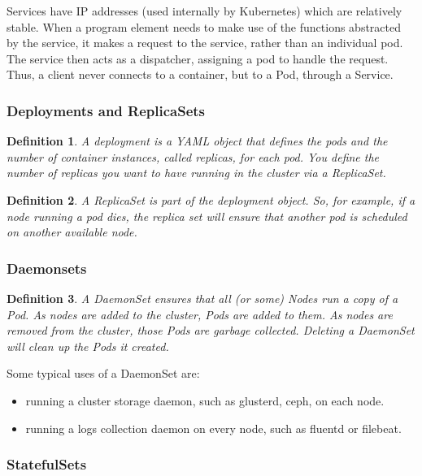 \documentclass{article}
\newtheorem{theorem}{Definition}[section]
\begin{document}
Services have IP addresses (used internally by Kubernetes) which are relatively stable. 
When a program element needs to make use of the functions abstracted by the service, 
it makes a request to the service, rather than an individual pod. 
The service then acts as a dispatcher, assigning a pod to handle the request. 
Thus, a client never connects to a container, but to a Pod, through a Service.

\subsubsection{Deployments and ReplicaSets}

\begin{theorem}
    A deployment is a YAML object that defines the pods and the number of container instances, called replicas, for each pod. 
    You define the number of replicas you want to have running in the cluster via a ReplicaSet.
\end{theorem}

\begin{theorem}
    A ReplicaSet is part of the deployment object. 
    So, for example, if a node running a pod dies, the replica set will ensure that another pod is scheduled on another available node.
\end{theorem}

\subsubsection{Daemonsets}

\begin{theorem}
    A DaemonSet ensures that all (or some) Nodes run a copy of a Pod. As nodes are added to the cluster, 
    Pods are added to them. As nodes are removed from the cluster, those Pods are garbage collected. 
    Deleting a DaemonSet will clean up the Pods it created.
\end{theorem}


Some typical uses of a DaemonSet are:

\begin{itemize}
    \item running a cluster storage daemon, such as glusterd, ceph, on each node.
    \item running a logs collection daemon on every node, such as fluentd or filebeat.
\end{itemize}

\subsubsection{StatefulSets}
\end{document}
